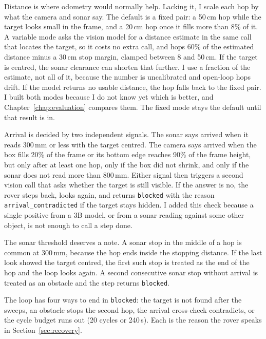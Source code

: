 Distance is where odometry would normally help. Lacking it, I scale each hop by
what the camera and sonar say. The default is a fixed pair: a 50\,cm hop while the
target looks small in the frame, and a 20\,cm hop once it fills more than 8\% of
it. A variable mode asks the vision model for a distance estimate in the same
call that locates the target, so it costs no extra call, and hops 60\% of the
estimated distance minus a 30\,cm stop margin, clamped between 8 and 50\,cm. If
the target is centred, the sonar clearance can shorten that further. I use a
fraction of the estimate, not all of it, because the number is uncalibrated and
open-loop hops drift. If the model returns no usable distance, the hop falls back
to the fixed pair. I built both modes because I do not know yet which is better,
and Chapter~\ref{chap:evaluation} compares them. The fixed mode stays the default
until that result is in.

Arrival is decided by two independent signals. The sonar says arrived when it
reads 300\,mm or less with the target centred. The camera says arrived when the
box fills 20\% of the frame or its bottom edge reaches 90\% of the frame height,
but only after at least one hop, only if the box did not shrink, and only if the
sonar does not read more than 800\,mm. Either signal then triggers a second vision
call that asks whether the target is still visible. If the answer is no, the rover
steps back, looks again, and returns \texttt{blocked} with the reason
\texttt{arrival\_contradicted} if the target stays hidden. I added this check
because a single positive from a 3B model, or from a sonar reading against some
other object, is not enough to call a step done.

The sonar threshold deserves a note. A sonar stop in the middle of a hop is common
at 300\,mm, because the hop ends inside the stopping distance. If the last look
showed the target centred, the first such stop is treated as the end of the hop and
the loop looks again. A second consecutive sonar stop without arrival is treated as
an obstacle and the step returns \texttt{blocked}. %

The loop has four ways to end in \texttt{blocked}: the target is not found after
the sweeps, an obstacle stops the second hop, the arrival cross-check
contradicts, or the cycle budget runs out (20 cycles or 240\,s). Each is the
reason the rover speaks in Section~\ref{sec:recovery}.

\label{ssec:survey}

